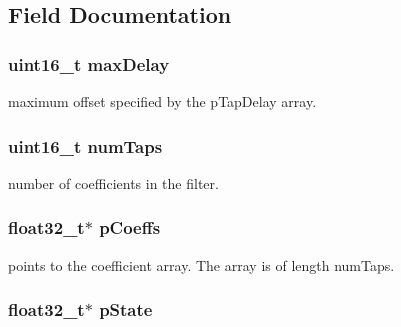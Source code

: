 \subsection{Field Documentation}
\hypertarget{structarm__fir__sparse__instance__f32_ab25f4ee7550e6d92acff77ada283733f}{
\subsubsection[{max\-Delay}]{\setlength{\rightskip}{0pt plus 5cm}uint16\-\_\-t max\-Delay}}\label{structarm__fir__sparse__instance__f32_ab25f4ee7550e6d92acff77ada283733f}
maximum offset specified by the p\-Tap\-Delay array. \hypertarget{structarm__fir__sparse__instance__f32_a751941891e47f522a7f5375fe8990aac}{
\subsubsection[{num\-Taps}]{\setlength{\rightskip}{0pt plus 5cm}uint16\-\_\-t num\-Taps}}\label{structarm__fir__sparse__instance__f32_a751941891e47f522a7f5375fe8990aac}
number of coefficients in the filter. \hypertarget{structarm__fir__sparse__instance__f32_aacbb8dd8eeba4b21fc2bb40076405ee3}{
\subsubsection[{p\-Coeffs}]{\setlength{\rightskip}{0pt plus 5cm}float32\-\_\-t$\ast$ p\-Coeffs}}\label{structarm__fir__sparse__instance__f32_aacbb8dd8eeba4b21fc2bb40076405ee3}
points to the coefficient array. The array is of length num\-Taps. \hypertarget{structarm__fir__sparse__instance__f32_a335c87e6fdc4b96601d95a5de8b9c463}{
\subsubsection[{p\-State}]{\setlength{\rightskip}{0pt plus 5cm}float32\-\_\-t$\ast$ p\-State}}\label{structarm__fir__sparse__instance__f32_a335c87e6fdc4b96601d95a5de8b9c463}
